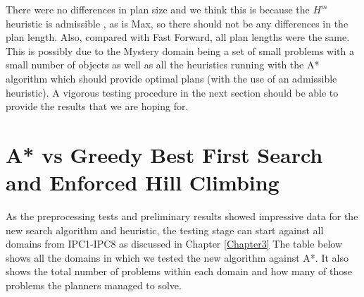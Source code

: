 There were no differences in plan size and we think this is because the $H^m$ heuristic is admissible \cite{hmAdmissible}, as is Max, so there should not be any differences in the plan length. Also, compared with Fast Forward, all plan lengths were the same. This is possibly due to the Mystery domain being a set of small problems with a small number of objects as well as all the heuristics running with the A* algorithm which should provide optimal plans (with the use of an admissible heuristic). A vigorous testing procedure in the next section should be able to provide the results that we are hoping for.  
\section{A* vs Greedy Best First Search and Enforced Hill Climbing}
As the preprocessing tests and preliminary results showed impressive data for the new search algorithm and heuristic, the testing stage can start against all domains from IPC1-IPC8 as discussed in Chapter \ref{Chapter3}
The table below shows all the domains in which we tested the new algorithm against A*. It also shows the total number of problems within each domain and how many of those problems the planners managed to solve. 
